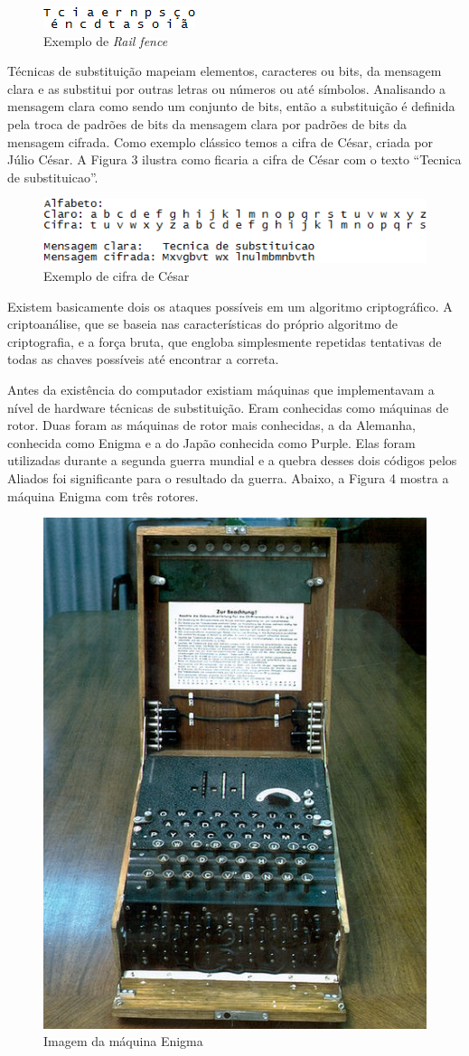 \begin{figure}[H]
    \centering
    \caption{Exemplo de \textit{Rail fence}}
    \includegraphics{Figuras/RailFence.png}
\end{figure}

Técnicas de substituição mapeiam elementos, caracteres ou bits, da mensagem clara e as substitui por outras letras ou números ou até símbolos. Analisando a mensagem clara como sendo um conjunto de bits, então a substituição é definida pela troca de padrões de bits da mensagem clara por padrões de bits da mensagem cifrada. Como exemplo clássico temos a cifra de César, criada por Júlio César. A Figura 3 ilustra como ficaria a cifra de César com o texto “Tecnica de substituicao”.

\begin{figure}[H]
    \centering
    \caption{Exemplo de cifra de César}
    \includegraphics{Figuras/CifraDeCesar.png}
\end{figure}

Existem basicamente dois os ataques possíveis em um algoritmo criptográfico. A criptoanálise, que se baseia nas características do próprio algoritmo de criptografia, e a força bruta, que engloba simplesmente repetidas tentativas de todas as chaves possíveis até encontrar a correta.

Antes da existência do computador existiam máquinas que implementavam a nível de hardware técnicas de substituição. Eram conhecidas como máquinas de rotor. Duas foram as máquinas de rotor mais conhecidas, a da Alemanha, conhecida como Enigma e a do Japão conhecida como Purple. Elas foram utilizadas durante a segunda guerra mundial e a quebra desses dois códigos pelos Aliados foi significante para o resultado da guerra. Abaixo, a Figura 4 mostra a máquina Enigma com três rotores.

\begin{figure}[H]
    \centering
    \caption{Imagem da máquina Enigma}
    \includegraphics[width=.35\linewidth]{Figuras/MaqEnigma.jpg}
\end{figure}

